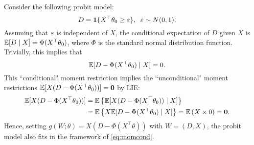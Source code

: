 \documentclass[11pt, A4paper, openany, uplatex]{book}
\begin{document}
\begin{example}\upshape\label{ex:probit}
	Consider the following probit model:
	\[
		D = \mathbf{1}\{X^\top\theta_0 \geq \varepsilon\}, \;\; \varepsilon \sim N(0,1).
	\]
	Assuming that $\varepsilon$ is independent of $X$, the conditional expectation of $D$ given $X$ is $\mathbb{E} [D \mid X] = \Phi(X^\top \theta_0)$, where $\Phi$ is the standard normal distribution function.
	Trivially, this implies that
	\[
		\mathbb{E}[D -  \Phi(X^\top \theta_0) \mid X] = 0.
	\]
	This ``conditional" moment restriction implies the ``unconditional" moment restrictions $\mathbb{E} [X (D -  \Phi(X^\top \theta_0))] = \mathbf{0}$ by LIE:
	\begin{align*}
	\mathbb{E} [X (D -  \Phi(X^\top \theta_0))] 
	& = \mathbb{E} \left\{ \mathbb{E}[X (D -  \Phi(X^\top \theta_0)) \mid X] \right\} \\
	& = \mathbb{E} \left\{ X \mathbb{E}[ D -  \Phi(X^\top \theta_0) \mid X] \right\} = \mathbb{E} \left( X \times 0 \right) = \mathbf{0}.
	\end{align*}
	Hence, setting $g(W; \theta) = X (D -  \Phi(X^\top \theta))$ with $W = (D,X)$, the probit model also fits in the framework of \eqref{eq:momcond}.
\end{example}
\end{document}
